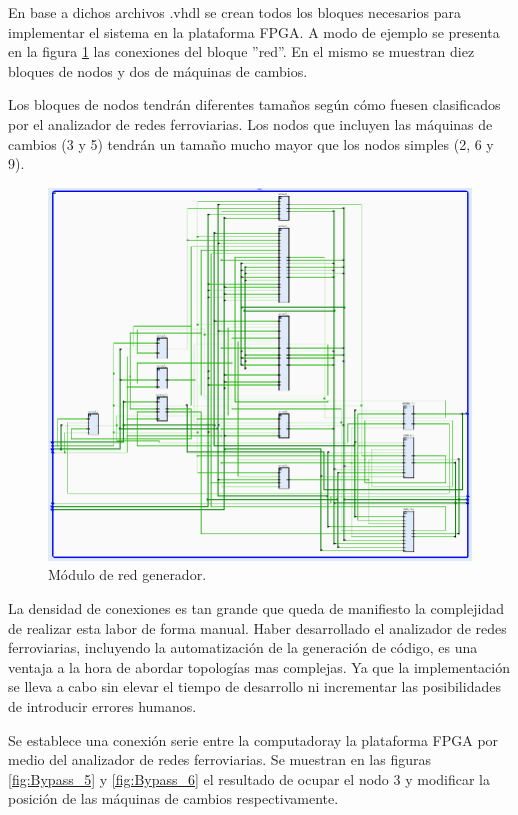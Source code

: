 	En base a dichos archivos .vhdl se crean todos los bloques necesarios para implementar el sistema en la plataforma FPGA. A modo de ejemplo se presenta en la figura \ref{fig:Bypass_4} las conexiones del bloque ''red''. En el mismo se muestran diez bloques de nodos y dos de máquinas de cambios. 
	
	Los bloques de nodos tendrán diferentes tamaños según cómo fuesen clasificados por el analizador de redes ferroviarias. Los nodos que incluyen las máquinas de cambios (3 y 5) tendrán un tamaño mucho mayor que los nodos simples (2, 6 y 9).
	
	\begin{figure}[h]
	\centering
	\includegraphics[scale=0.6]{./Figures/Red}
		\caption{Módulo de red generador.}
		\label{fig:Bypass_4}
	\end{figure}
	
	\vspace{5cm}
	
	La densidad de conexiones es tan grande que queda de manifiesto la complejidad de realizar esta labor de forma manual. Haber desarrollado el analizador de redes ferroviarias, incluyendo la automatización de la generación de código, es una ventaja a la hora de abordar topologías mas complejas. Ya que la implementación se lleva a cabo sin elevar el tiempo de desarrollo ni incrementar las posibilidades de introducir errores humanos.
	
	Se establece una conexión serie entre la computadoray la plataforma FPGA por medio del analizador de redes ferroviarias. Se muestran en las figuras \ref{fig:Bypass_5} y \ref{fig:Bypass_6} el resultado de ocupar el nodo 3 y modificar la posición de las máquinas de cambios respectivamente.

